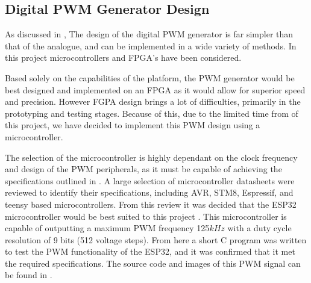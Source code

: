 \subsection{Digital PWM Generator Design}\label{S:digital_design}

As discussed in , The design of the digital PWM generator is far simpler than that of the analogue, and can be implemented in a wide variety of methods. In this project microcontrollers and FPGA's have been considered.

Based solely on the capabilities of the platform, the PWM generator would be best designed and implemented on an FPGA as it would allow for superior speed and precision. However FGPA design brings a lot of difficulties, primarily in the prototyping and testing stages. Because of this, due to the limited time from of this project, we have decided to implement this PWM design using a microcontroller.

The selection of the microcontroller is highly dependant on the clock frequency and design of the PWM peripherals, as it must be capable of achieving the specifications outlined in . A large selection of microcontroller datasheets were reviewed to identify their specifications, including AVR, STM8, Espressif, and teensy based microcontrollers. From this review it was decided that the ESP32 microcontroller would be best suited to this project \cite{ESP32Manual}. This microcontroller is capable of outputting a maximum PWM frequency 125$kHz$ with a duty cycle resolution of 9 bits (512 voltage steps). From here a short C program was written to test the PWM functionality of the ESP32, and it was confirmed that it met the required specifications. The source code and images of this PWM signal can be found in .